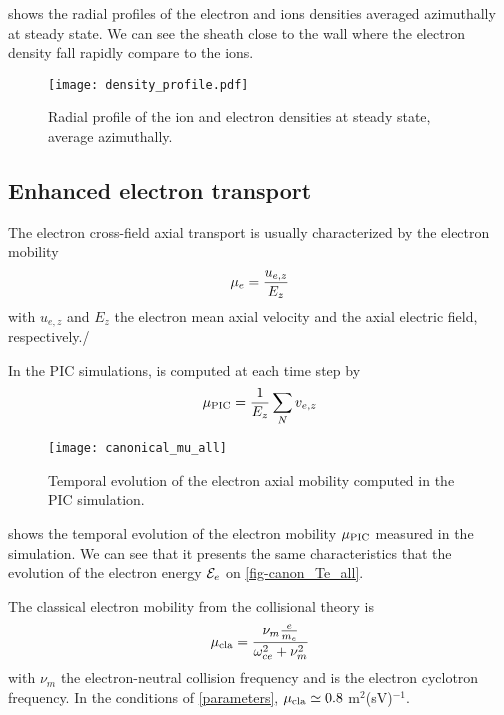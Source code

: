    shows the radial profiles of the electron and ions densities averaged azimuthally at steady state.
  We can see the sheath close to the wall where the electron density fall rapidly compare to the ions.
  
  \begin{figure}[hbtp]
    \centering
    \texttt{[image: density\_profile.pdf]}
    \caption{Radial profile of the ion and electron densities at steady state, average azimuthally.}
    \label{fig-profiles}
  \end{figure}
  
  \subsection{Enhanced electron transport} \label{subsec-canonmue}
  The electron cross-field axial transport is usually characterized by the electron mobility
  \begin{equation} \label{eq-mobdef}
    \mu_e = \frac{u_{e, z}}{E_z}
  \end{equation}
  with $u_{e,z}$ and $E_z$ the electron mean axial velocity and the axial electric field, respectively./
  
  In the \ac{PIC} simulations, \mob is computed at each time step by
  \begin{equation} \label{eq-mobpic}
    \mu_{\mathrm{PIC}} = \frac{1}{E_z} \sum_N v_{e,z}
  \end{equation}

  \begin{figure}[hbtp]
    \centering
    \texttt{[image: canonical\_mu\_all]}
    \caption{Temporal evolution of the electron axial mobility computed in the \ac{PIC} simulation.}
    \label{fig-canon_mu}
  \end{figure}
  
   shows the temporal evolution of the electron mobility $\mu_{\mathrm{PIC}}$ measured in the simulation.
  We can see that it presents the same characteristics that the evolution of the electron energy ${\mathcal{E}_e}$ on \cref{fig-canon_Te_all}.
  
  The classical electron mobility from the collisional theory is \citep{lafleur2016a}
  \begin{equation} \label{eq-muclass}
    \mu_{\rm cla} = \frac{\nu_m \frac{e}{m_e}}{\omega_{ce}^2 + \nu_m^2}
  \end{equation}
  with $\nu_m$ the electron-neutral  collision frequency and \oce is the electron cyclotron frequency.
  In the conditions of \cref{parameters}, $\mu_{\rm cla} \simeq 0.8$ m$^2$(sV)$^{-1}$.
  
